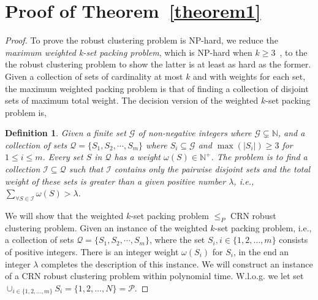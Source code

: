 \documentclass[times]{ettauth}
\newcommand{\ie}{i.e., }
\theoremstyle{mytheoremstyle}
\theoremstyle{mytheoremstyle}
\theoremstyle{mytheoremstyle}
\newtheorem{mydef}{Definition}
\begin{document}
\section{Proof of Theorem~\ref{theorem1}}
\label{proof_theorem1}
\begin{proof}
To prove the robust clustering problem is NP-hard, we reduce the \textit{maximum weighted k-set packing problem}, which is NP-hard when $k\geqslant 3$~\cite{Computers_a_Intractability}, to the the robust clustering problem to show the latter is at least as hard as the former.
Given a collection of sets of cardinality at most $k$ and with weights for each set, the maximum weighted packing problem is that of finding a collection of disjoint sets of maximum total weight.
The decision version of the weighted $k$-set packing problem is,
\begin{mydef}
\label{def_kset_packing}
Given a finite set $\mathcal{G}$ of non-negative integers where $\mathcal{G} \subsetneq \mathbb{N}$, and a collection of sets $\mathcal{Q}=\{S_1,S_2,\cdots,S_m\}$ where $S_i \subseteq \mathcal{G}$ and $\max(|S_i|)\geq 3$ for $1 \leq i \leq m$.
Every set $S$ in $\mathcal{Q}$ has a weight $\omega(S) \in \mathbb{N}^+$. 
%
The problem is to find a collection $\mathcal{I} \subseteq \mathcal{Q}$ such that $\mathcal{I}$ contains only the pairwise disjoint sets and the total weight of these sets is greater than a given positive number $\lambda$, i.e., $\sum_{\forall S \in \mathcal{I}} \omega(S) > \lambda$.
\end{mydef}



We will show that the weighted $k$-set packing problem $\leq_P$ CRN robust clustering problem.
Given an instance of the weighted $k$-set packing problem, \ie a collection of sets $\mathcal{Q}=\{S_1,S_2,\cdots,S_m\}$, where the set $S_i, i\in \{1,2,\ldots,m\}$ consists of positive integers.
There is an integer weight $\omega(S_i)$ for $S_i$, in the end an integer $\lambda$ completes the description of this instance.
We will construct an instance of a CRN robust clustering problem within polynomial time.
W.l.o.g. we let set $\cup_{i\in\{1, 2,\ldots, m\}}S_i = \{ 1, 2,\ldots , N \} = \mathcal{P}$.


\end{proof}
\end{document}
